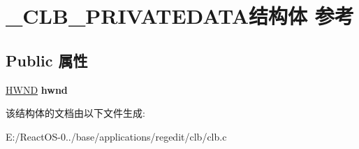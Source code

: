 \hypertarget{struct___c_l_b___p_r_i_v_a_t_e_d_a_t_a}{}\section{\+\_\+\+C\+L\+B\+\_\+\+P\+R\+I\+V\+A\+T\+E\+D\+A\+T\+A结构体 参考}
\label{struct___c_l_b___p_r_i_v_a_t_e_d_a_t_a}
\subsection*{Public 属性}
\begin{DoxyCompactItemize}
\item 
\mbox{\label{struct___c_l_b___p_r_i_v_a_t_e_d_a_t_a_aa7fae908bc4b75b0174f15bdf6e49665}} 
\hyperlink{interfacevoid}{H\+W\+ND} {\bfseries hwnd}
\end{DoxyCompactItemize}


该结构体的文档由以下文件生成\+:\begin{DoxyCompactItemize}
\item 
E\+:/\+React\+O\+S-\/0../base/applications/regedit/clb/clb.\+c\end{DoxyCompactItemize}

